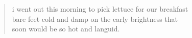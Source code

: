 

\begin{verse}
i went out this morning to pick lettuce for our breakfast \\
bare feet cold and damp on the early brightness that \\
soon would be so hot and languid. 
\end{verse}
